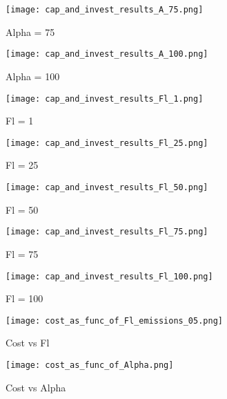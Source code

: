 \documentclass[singlespace]{easychithesis}
\begin{document}
\begin{figure}[h]\label{fig:SimpleResultsA=75}
\texttt{[image: cap\_and\_invest\_results\_A\_75.png]}
\caption{Alpha = 75}
\end{figure}


\begin{figure}[h]\label{fig:SimpleResultsA=100}
\texttt{[image: cap\_and\_invest\_results\_A\_100.png]}
\caption{Alpha = 100}
\end{figure}




\begin{figure}[h]\label{fig:SimpleResultsFl=1}
\texttt{[image: cap\_and\_invest\_results\_Fl\_1.png]}
\caption{Fl = 1}
\end{figure}


\begin{figure}[h]\label{fig:SimpleResultsFl=25}
\texttt{[image: cap\_and\_invest\_results\_Fl\_25.png]}
\caption{Fl = 25}
\end{figure}


\begin{figure}[h]\label{fig:SimpleResultsFl=50}
\texttt{[image: cap\_and\_invest\_results\_Fl\_50.png]}
\caption{Fl = 50}
\end{figure}

\begin{figure}[h]\label{fig:SimpleResultsFl=75}
\texttt{[image: cap\_and\_invest\_results\_Fl\_75.png]}
\caption{Fl = 75}
\end{figure}

\begin{figure}[h]\label{fig:SimpleResultsFl=100}
\texttt{[image: cap\_and\_invest\_results\_Fl\_100.png]}
\caption{Fl = 100}
\end{figure}


\begin{figure}[h]\label{fig:costVsFl}
\texttt{[image: cost\_as\_func\_of\_Fl\_emissions\_05.png]}
\caption{Cost vs Fl}
\end{figure}

\begin{figure}[h]\label{fig:costVsAlpha}
\texttt{[image: cost\_as\_func\_of\_Alpha.png]}
\caption{Cost vs Alpha}
\end{figure}






\FloatBarrier
\end{document}
